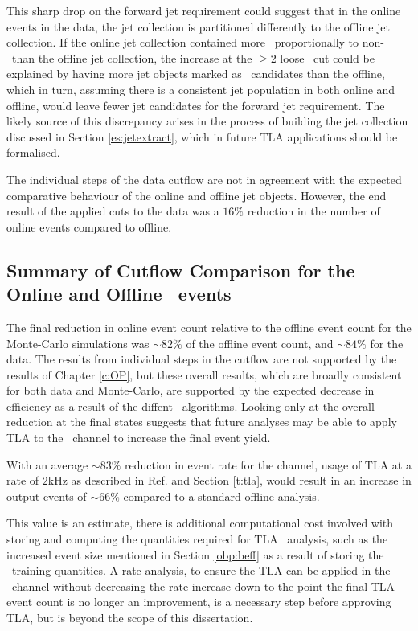    This sharp drop on the forward jet requirement could suggest that in the online events in the data, the jet collection is partitioned differently to the offline jet collection. If the online jet collection contained more \bjets\ proportionally to non-\bjets\ than the offline jet collection, the increase at the $\geq2$ loose \bjet\ cut could be explained by having more jet objects marked as \bjet\ candidates than the offline, which in turn, assuming there is a consistent jet population in both online and offline, would leave fewer jet candidates for the forward jet requirement. The likely source of this discrepancy arises in the process of building the jet collection discussed in Section \ref{es:jetextract}, which in future TLA applications should be formalised.

    The individual steps of the data cutflow are not in agreement with the expected comparative behaviour of the online and offline jet objects. However, the end result of the applied cuts to the data was a $16\%$ reduction in the number of online events compared to offline.

    \subsection{Summary of Cutflow Comparison for the Online and Offline \VBFHBB\ events}

    The final reduction in online event count relative to the offline event count for the Monte-Carlo simulations was $\sim82\%$ of the offline event count, and $\sim84\%$  for the data. The results from individual steps in the cutflow are not supported by the results of Chapter \ref{c:OP}, but these overall results, which are broadly consistent for both data and Monte-Carlo, are supported by the expected decrease in efficiency as a result of the diffent \btag\ algorithms. Looking only at the overall reduction at the final states suggests that future analyses may be able to apply TLA to the \VBFHBB\ channel to increase the final event yield.

    With an average $\sim83\%$ reduction in event rate for the channel, usage of TLA at a rate of $2$kHz as described in Ref. \cite{tla} and Section \ref{t:tla}, would result in an increase in output events of $\sim66\%$ compared to a standard offline analysis.

    This value is an estimate, there is additional computational cost involved with storing and computing the quantities required for TLA \VBFHBB\ analysis, such as the increased event size mentioned in Section \ref{obp:beff} as a result of storing the \btag\ training quantities. A rate analysis, to ensure the TLA can be applied in the \VBFHBB\ channel without decreasing the rate increase down to the point the final TLA event count is no longer an improvement, is a necessary step before approving TLA, but is beyond the scope of this dissertation.

